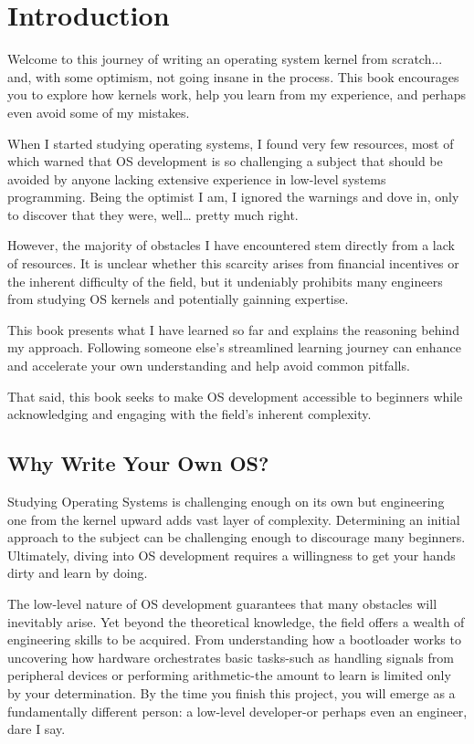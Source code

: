 \chapter{Introduction}

Welcome to this journey of writing an operating system kernel from scratch... and, with some optimism, not going insane in the 
process. This book encourages you to explore how kernels work, help you learn from my experience, and 
perhaps even avoid some of my mistakes. 

When I started studying operating systems, I found very few resources, most of which warned that
OS development is so challenging a subject that should be avoided by anyone lacking extensive experience
in low-level systems programming. Being the optimist I am, I ignored the warnings and dove in, only to discover 
that they were, well… pretty much right.

However, the majority of obstacles I have encountered stem directly from a lack of resources.
It is unclear whether this scarcity arises from financial incentives or the inherent difficulty of the field, 
but it undeniably prohibits many engineers from studying OS kernels and potentially gainning expertise.

This book presents what I have learned so far and explains the reasoning behind my approach. Following someone else's 
streamlined learning journey can enhance and accelerate your own understanding and help avoid common pitfalls.

That said, this book seeks to make OS development accessible to beginners while acknowledging and engaging with the 
field's inherent complexity.

\section{Why Write Your Own OS?}

Studying Operating Systems is challenging enough on its own but engineering one from the kernel upward adds vast layer of
complexity. Determining an initial approach to the subject can be challenging enough to discourage many beginners. 
Ultimately, diving into OS development requires a willingness to get your hands dirty and learn by doing.

The low-level nature of OS development guarantees that many obstacles will inevitably arise. 
Yet beyond the theoretical knowledge, the field offers a wealth of engineering skills to be acquired. 
From understanding how a bootloader works to uncovering how hardware orchestrates basic tasks-such as handling 
signals from peripheral devices or performing arithmetic-the amount to learn is limited only by your determination. 
By the time you finish this project, you will emerge as a fundamentally different person: a low-level developer-or 
perhaps even an engineer, dare I say.


